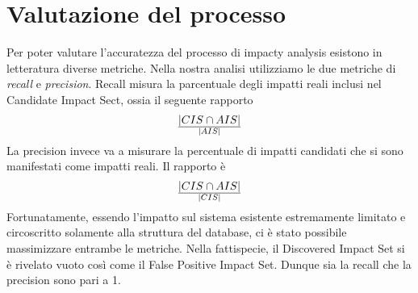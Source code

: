 \chapter{Valutazione del processo}
Per poter valutare l'accuratezza del processo di impacty analysis esistono in letteratura diverse metriche. Nella nostra analisi utilizziamo le due metriche di \textit{recall} e \textit{precision}. Recall misura la parcentuale degli impatti reali inclusi nel Candidate Impact Sect, ossia il seguente rapporto
$$|CIS \cap AIS|\over{|AIS|}$$
La precision invece va a misurare la percentuale di impatti candidati che si sono manifestati come impatti reali. Il rapporto è
$${|CIS \cap AIS|}\over{|CIS|}$$
Fortunatamente, essendo l'impatto sul sistema esistente estremamente limitato e circoscritto solamente alla struttura del database, ci è stato possibile massimizzare entrambe le metriche. Nella fattispecie, il Discovered Impact Set si è rivelato vuoto così come il False Positive Impact Set. Dunque sia la recall che la precision sono pari a 1.
